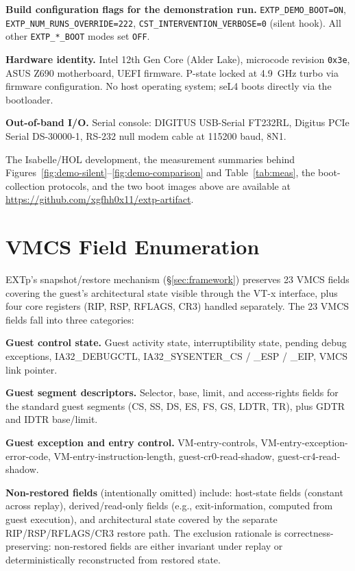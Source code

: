 \documentclass[conference]{IEEEtran}
\newcommand{\artifacturl}{https://github.com/xgfhh0x11/extp-artifact}
\newcommand{\artifactref}{\url{\artifacturl}}
\newcommand{\artifactref}{the artifact repository; URL withheld for double-blind review}
\begin{document}
\textbf{Build configuration flags for the demonstration run.}
\texttt{EXTP\_DEMO\_BOOT=ON},
\texttt{EXTP\_NUM\_RUNS\_OVERRIDE=222},
\texttt{CST\_INTERVENTION\_VERBOSE=0} (silent hook).
All other \texttt{EXTP\_*\_BOOT} modes set \texttt{OFF}.

\textbf{Hardware identity.} Intel 12th Gen Core (Alder Lake),
microcode revision \texttt{0x3e}, ASUS Z690 motherboard, UEFI
firmware. P-state locked at 4.9~GHz turbo via firmware
configuration. No host operating system; seL4 boots directly via
the bootloader.

\textbf{Out-of-band I/O.} Serial console: DIGITUS USB-Serial
FT232RL, Digitus PCIe Serial DS-30000-1, RS-232 null modem cable
at 115200 baud, 8N1.

The Isabelle/HOL development, the measurement summaries behind
Figures~\ref{fig:demo-silent}--\ref{fig:demo-comparison} and
Table~\ref{tab:meas}, the boot-collection protocols, and the two
boot images above are available at \artifactref.

\section{VMCS Field Enumeration}\label{app:vmcs}

EXTp's snapshot/restore mechanism (\S\ref{sec:framework})
preserves 23 VMCS fields covering the guest's architectural
state visible through the VT-x interface, plus four core
registers (RIP, RSP, RFLAGS, CR3) handled separately. The 23
VMCS fields fall into three categories:

\textbf{Guest control state.} Guest activity state,
interruptibility state, pending debug exceptions, IA32\_DEBUGCTL,
IA32\_SYSENTER\_CS / \_ESP / \_EIP, VMCS link pointer.

\textbf{Guest segment descriptors.} Selector, base, limit, and
access-rights fields for the standard guest segments
(CS, SS, DS, ES, FS, GS, LDTR, TR), plus GDTR and IDTR base/limit.

\textbf{Guest exception and entry control.} VM-entry-controls,
VM-entry-exception-error-code, VM-entry-instruction-length,
guest-cr0-read-shadow, guest-cr4-read-shadow.

\textbf{Non-restored fields} (intentionally omitted) include:
host-state fields (constant across replay), derived/read-only
fields (e.g., exit-information, computed from guest execution),
and architectural state covered by the separate RIP/RSP/RFLAGS/CR3
restore path. The exclusion rationale is correctness-preserving:
non-restored fields are either invariant under replay or
deterministically reconstructed from restored state.
\end{document}
